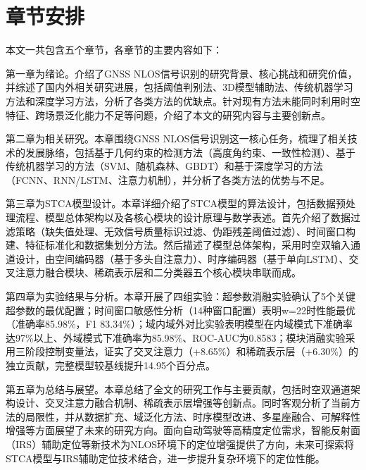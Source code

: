 \section{章节安排}

    本文一共包含五个章节，各章节的主要内容如下：

    第一章为绪论。介绍了GNSS NLOS信号识别的研究背景、核心挑战和研究价值，并综述了国内外相关研究进展，包括阈值判别法、3D模型辅助法、传统机器学习方法和深度学习方法，分析了各类方法的优缺点。针对现有方法未能同时利用时空特征、跨场景泛化能力不足等问题，介绍了本文的研究内容与主要创新点。

    第二章为相关研究。本章围绕GNSS NLOS信号识别这一核心任务，梳理了相关技术的发展脉络，包括基于几何约束的检测方法（高度角约束、一致性检测）、基于传统机器学习的方法（SVM、随机森林、GBDT）和基于深度学习的方法（FCNN、RNN/LSTM、注意力机制），并分析了各类方法的优势与不足。

    第三章为STCA模型设计。本章详细介绍了STCA模型的算法设计，包括数据预处理流程、模型总体架构以及各核心模块的设计原理与数学表述。首先介绍了数据过滤策略（缺失值处理、无效信号质量标识过滤、伪距残差阈值过滤）、时间窗口构建、特征标准化和数据集划分方法。然后描述了模型总体架构，采用时空双输入通道设计，由空间编码器（基于多头自注意力）、时序编码器（基于单向LSTM）、交叉注意力融合模块、稀疏表示层和二分类器五个核心模块串联而成。

    第四章为实验结果与分析。本章开展了四组实验：超参数消融实验确认了5个关键超参数的最优配置；时间窗口敏感性分析（14种窗口配置）表明w=22时性能最优（准确率85.98\%，F1 83.34\%）；域内域外对比实验表明模型在内域模式下准确率达97\%以上、外域模式下准确率为85.98\%、ROC-AUC为0.8583；模块消融实验采用三阶段控制变量法，证实了交叉注意力（+8.65\%）和稀疏表示层（+6.30\%）的独立贡献，完整模型较基线提升14.95个百分点。

    第五章为总结与展望。本章总结了全文的研究工作与主要贡献，包括时空双通道架构设计、交叉注意力融合机制、稀疏表示层增强等创新点。同时客观分析了当前方法的局限性，并从数据扩充、域泛化方法、时序模型改进、多星座融合、可解释性增强等方面展望了未来的研究方向。面向自动驾驶等高精度定位需求，智能反射面（IRS）辅助定位等新技术为NLOS环境下的定位增强提供了方向\cite{zhu2024irs}，未来可探索将STCA模型与IRS辅助定位技术结合，进一步提升复杂环境下的定位性能。



